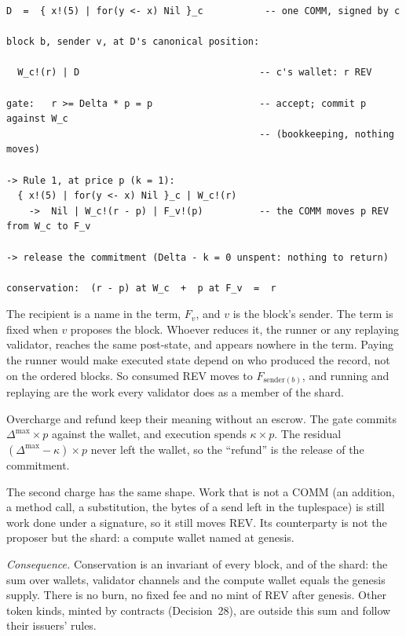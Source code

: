 \documentclass[11pt]{article}
\begin{document}
\begin{Verbatim}[fontsize=\footnotesize,frame=single,framesep=6pt]
D  =  { x!(5) | for(y <- x) Nil }_c           -- one COMM, signed by c

block b, sender v, at D's canonical position:

  W_c!(r) | D                                -- c's wallet: r REV

gate:   r >= Delta * p = p                   -- accept; commit p against W_c
                                             -- (bookkeeping, nothing moves)

-> Rule 1, at price p (k = 1):
  { x!(5) | for(y <- x) Nil }_c | W_c!(r)
    ->  Nil | W_c!(r - p) | F_v!(p)          -- the COMM moves p REV from W_c to F_v

-> release the commitment (Delta - k = 0 unspent: nothing to return)

conservation:  (r - p) at W_c  +  p at F_v  =  r
\end{Verbatim}

The recipient is a name in the term, $F_v$, and $v$ is the block's sender. The term is fixed when $v$ proposes the block. Whoever reduces it, the runner or any replaying validator, reaches the same post-state, and appears nowhere in the term. Paying the runner would make executed state depend on who produced the record, not on the ordered blocks. So consumed REV moves to $F_{\mathrm{sender}(b)}$, and running and replaying are the work every validator does as a member of the shard.

Overcharge and refund keep their meaning without an escrow. The gate commits $\Delta^{\max} \times p$ against the wallet, and execution spends $\kappa \times p$. The residual $(\Delta^{\max} - \kappa) \times p$ never left the wallet, so the ``refund'' is the release of the commitment.

The second charge has the same shape. Work that is not a COMM (an addition, a method call, a substitution, the bytes of a send left in the tuplespace) is still work done under a signature, so it still moves REV. Its counterparty is not the proposer but the shard: a compute wallet named at genesis.

\emph{Consequence.} Conservation is an invariant of every block, and of the shard: the sum over wallets, validator channels and the compute wallet equals the genesis supply. There is no burn, no fixed fee and no mint of REV after genesis. Other token kinds, minted by contracts (Decision~28), are outside this sum and follow their issuers' rules.
\end{document}
